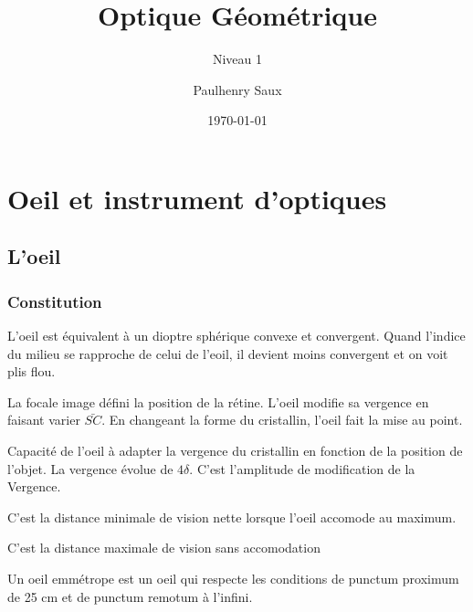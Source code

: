 \documentclass[french]{yLectureNote}
\title{Optique Géométrique}
\subtitle{Niveau 1}
\author{Paulhenry Saux}
\date{\today}
\begin{document}

\setcounter{chapter}{5}
\chapter{Oeil et instrument d'optiques}
\section{L'oeil}
\subsection{Constitution}


L'oeil est équivalent à un dioptre sphérique convexe et convergent. Quand l'indice du milieu se rapproche de celui de l'eoil, il devient moins convergent et on voit plis flou.

La focale image défini la position de la rétine. L'oeil modifie sa vergence en faisant varier $\bar{SC}$. En changeant la forme du cristallin, l'oeil fait la mise au point.

\begin{definition}[Accomodation]
Capacité de l'oeil à adapter la vergence du cristallin en fonction de la position de l'objet. La vergence évolue de $4\delta$. C'est l'amplitude de modification de la Vergence.
\end{definition}
\begin{definition}
C'est la distance minimale de vision nette lorsque l'oeil accomode au maximum.
\end{definition}
\begin{definition}
C'est la distance maximale de vision sans accomodation
\end{definition}
\begin{definition}
Un oeil emmétrope est un oeil qui respecte les conditions de punctum proximum  de 25 cm et de punctum remotum à l'infini.
\end{definition}
\end{document}
